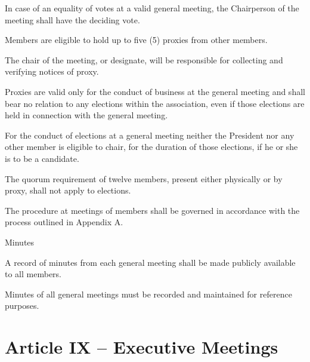 \documentclass[12pt,a4paper]{article}
\begin{document}
\begin{constitutionlist}
\begin{constitutionlist}
\item In case of an equality of votes at a valid general meeting, the Chairperson of the meeting shall have the deciding vote.

\item Members are eligible to hold up to five (5) proxies from other members. 

\item The chair of the meeting, or designate, will be responsible for collecting and verifying notices of proxy.

\item Proxies are valid only for the conduct of business at the general meeting and shall bear no relation to any elections within the association, even if those elections are held in connection with the general meeting.

\item For the conduct of elections at a general meeting neither the President nor any other member is eligible to chair, for the duration of those elections, if he or she is to be a candidate.

\item The quorum requirement of twelve members, present either physically or by proxy, shall not apply to elections.

\item The procedure at meetings of members shall be governed in accordance with the process outlined in
Appendix A.
\end{constitutionlist}

\item Minutes

\begin{constitutionlist}
\item A record of minutes from each general meeting shall be made publicly available to all members.

\item Minutes of all general meetings must be recorded and maintained for reference purposes.
\end{constitutionlist}
\end{constitutionlist}

\section{Article IX – Executive Meetings}
\end{document}
